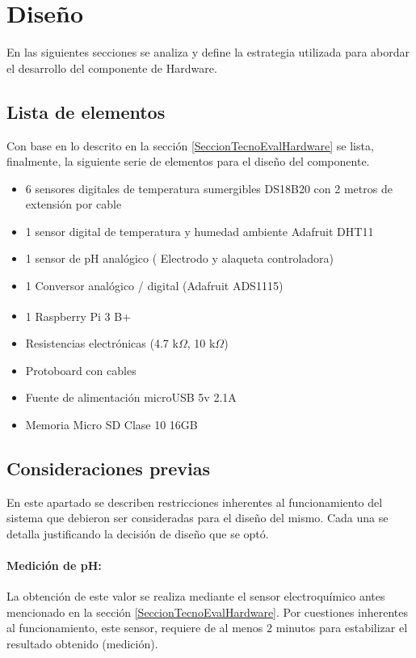         
\section{Diseño}
    \par En las siguientes secciones se analiza y define la estrategia utilizada para abordar el desarrollo del componente de Hardware.
    
    \subsection{Lista de elementos}
    \label{subsectionListaElemHard}
    Con base en lo descrito en la sección \ref{SeccionTecnoEvalHardware} se lista, finalmente, la siguiente serie de elementos para el diseño del componente.
        \begin{itemize}
            \item 6 sensores digitales de temperatura sumergibles DS18B20 con 2 metros de extensión por cable
            \item 1 sensor digital de temperatura y humedad ambiente Adafruit DHT11
            \item 1 sensor de pH analógico ( Electrodo y alaqueta controladora)
            \item 1 Conversor analógico / digital (Adafruit ADS1115)
            \item 1 Raspberry\textsuperscript{\textregistered} Pi 3 B+
            \item Resistencias electrónicas (4.7 k$\Omega$, 10 k$\Omega$)
            \item Protoboard con cables
            \item Fuente de alimentación microUSB 5v 2.1A
            \item Memoria Micro SD Clase 10 16GB
        \end{itemize}
        
    \subsection{Consideraciones previas}
    \label{subseccionConsideracionesPreviasSensores}
        \par En este apartado se describen restricciones inherentes al funcionamiento del sistema que debieron ser consideradas para el diseño del mismo. Cada una se detalla justificando la decisión de diseño que se optó.
        
        \paragraph{Medición de pH:} 
            La obtención de este valor se realiza mediante el sensor electroquímico antes mencionado en la sección \ref{SeccionTecnoEvalHardware}. Por cuestiones inherentes al funcionamiento, este sensor, requiere de al menos 2 minutos para estabilizar el resultado obtenido (medición).
            
